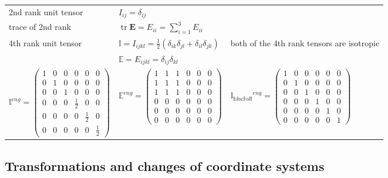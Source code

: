 	\begin{tabularx}{\columnwidth}{lXX}
		\hline
		2nd rank unit tensor & $I_{ij} = \delta_{ij}$ &\\
		trace of 2nd rank & $\operatorname{tr} \mathbf{E} = E_{ii} = \sum\limits_{i=1}^3 E_{ii}$ &\\
		4th rank unit tensor & $\mathbb{I} = I_{ijkl} = \frac{1}{2}(\delta_{ik}\delta_{jl} + \delta_{il}\delta_{jk}) $ & both of the 4th rank tensors are isotropic\\
						 & $\mathbb{E} = E_{ijkl} =  \delta_{ij}\delta_{kl}$ &\\
						 
		$ \mathbb{I}^{eng}=
		\begin{pmatrix}
			1 & 0 & 0 & 0 & 0 & 0 \\ 
			0 & 1 & 0 & 0 & 0 & 0 \\ 
			0 & 0 & 1 & 0 & 0 & 0 \\ 
			0 & 0 & 0 & \frac{1}{2} & 0 & 0 \\ 
			0 & 0 & 0 & 0 & \frac{1}{2} & 0 \\ 
			0 & 0 & 0 & 0 & 0 & \frac{1}{2}
		\end{pmatrix}$& 
		
		$
		\mathbb{E}^{eng}=
		\begin{pmatrix}
		1 & 1 & 1 & 0 & 0 & 0 \\ 
		1 & 1 & 1 & 0 & 0 & 0 \\ 
		1 & 1 & 1 & 0 & 0 & 0 \\ 
		0 & 0 & 0 & 0 & 0 & 0 \\ 
		0 & 0 & 0 & 0 & 0 & 0 \\ 
		0 & 0 & 0 & 0 & 0 & 0
		\end{pmatrix} 
		$	&
		$ \mathbb{I_{\text{bischsil}}}^{eng}=
		\begin{pmatrix}
		1 & 0 & 0 & 0 & 0 & 0 \\ 
		0 & 1 & 0 & 0 & 0 & 0 \\ 
		0 & 0 & 1 & 0 & 0 & 0 \\ 
		0 & 0 & 0 & 1 & 0 & 0 \\ 
		0 & 0 & 0 & 0 & 1 & 0 \\ 
		0 & 0 & 0 & 0 & 0 & 1
		\end{pmatrix}$
			\\
							 
   	   \hline
	\end{tabularx}
	
	\subsection{Transformations and changes of coordinate systems}
	

